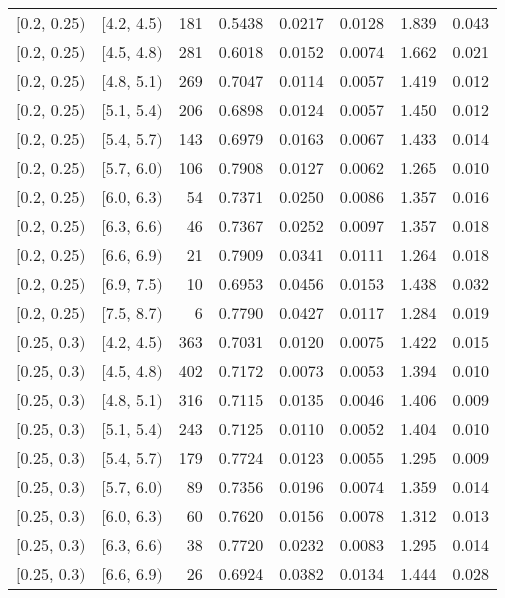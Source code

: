 \begin{longtable}{| l | l | r | r | r | r | r | r |}
        $[$0.2, 0.25$)$ & $[$4.2, 4.5$)$ & 181 & 0.5438 & 0.0217 & 0.0128 & 1.839 & 0.043 \\
        $[$0.2, 0.25$)$ & $[$4.5, 4.8$)$ & 281 & 0.6018 & 0.0152 & 0.0074 & 1.662 & 0.021 \\
        $[$0.2, 0.25$)$ & $[$4.8, 5.1$)$ & 269 & 0.7047 & 0.0114 & 0.0057 & 1.419 & 0.012 \\
        $[$0.2, 0.25$)$ & $[$5.1, 5.4$)$ & 206 & 0.6898 & 0.0124 & 0.0057 & 1.450 & 0.012 \\
        $[$0.2, 0.25$)$ & $[$5.4, 5.7$)$ & 143 & 0.6979 & 0.0163 & 0.0067 & 1.433 & 0.014 \\
        $[$0.2, 0.25$)$ & $[$5.7, 6.0$)$ & 106 & 0.7908 & 0.0127 & 0.0062 & 1.265 & 0.010 \\
        $[$0.2, 0.25$)$ & $[$6.0, 6.3$)$ & 54 & 0.7371 & 0.0250 & 0.0086 & 1.357 & 0.016 \\
        $[$0.2, 0.25$)$ & $[$6.3, 6.6$)$ & 46 & 0.7367 & 0.0252 & 0.0097 & 1.357 & 0.018 \\
        $[$0.2, 0.25$)$ & $[$6.6, 6.9$)$ & 21 & 0.7909 & 0.0341 & 0.0111 & 1.264 & 0.018 \\
        $[$0.2, 0.25$)$ & $[$6.9, 7.5$)$ & 10 & 0.6953 & 0.0456 & 0.0153 & 1.438 & 0.032 \\
        $[$0.2, 0.25$)$ & $[$7.5, 8.7$)$ & 6 & 0.7790 & 0.0427 & 0.0117 & 1.284 & 0.019 \\
        $[$0.25, 0.3$)$ & $[$4.2, 4.5$)$ & 363 & 0.7031 & 0.0120 & 0.0075 & 1.422 & 0.015 \\
        $[$0.25, 0.3$)$ & $[$4.5, 4.8$)$ & 402 & 0.7172 & 0.0073 & 0.0053 & 1.394 & 0.010 \\
        $[$0.25, 0.3$)$ & $[$4.8, 5.1$)$ & 316 & 0.7115 & 0.0135 & 0.0046 & 1.406 & 0.009 \\
        $[$0.25, 0.3$)$ & $[$5.1, 5.4$)$ & 243 & 0.7125 & 0.0110 & 0.0052 & 1.404 & 0.010 \\
        $[$0.25, 0.3$)$ & $[$5.4, 5.7$)$ & 179 & 0.7724 & 0.0123 & 0.0055 & 1.295 & 0.009 \\
        $[$0.25, 0.3$)$ & $[$5.7, 6.0$)$ & 89 & 0.7356 & 0.0196 & 0.0074 & 1.359 & 0.014 \\
        $[$0.25, 0.3$)$ & $[$6.0, 6.3$)$ & 60 & 0.7620 & 0.0156 & 0.0078 & 1.312 & 0.013 \\
        $[$0.25, 0.3$)$ & $[$6.3, 6.6$)$ & 38 & 0.7720 & 0.0232 & 0.0083 & 1.295 & 0.014 \\
        $[$0.25, 0.3$)$ & $[$6.6, 6.9$)$ & 26 & 0.6924 & 0.0382 & 0.0134 & 1.444 & 0.028 \\

\end{longtable}
